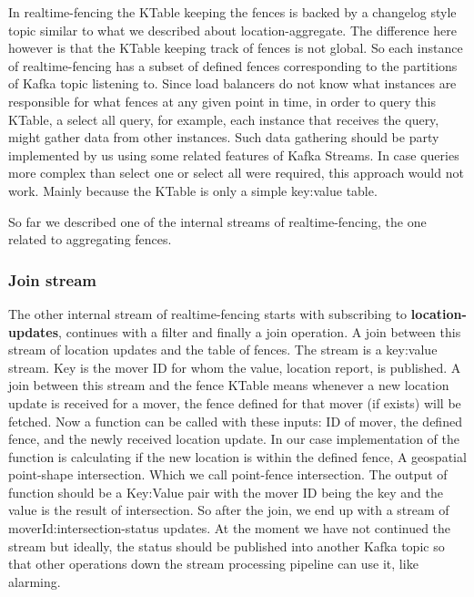 \documentclass[a4]{report}
\begin{document}
    In realtime-fencing the KTable keeping the fences is backed by a changelog style topic similar to what we
    described about location-aggregate.
    The difference here however is that the KTable keeping track of fences is not global.
    So each instance of realtime-fencing has a subset of defined fences corresponding to the partitions of Kafka topic listening to.
    Since load balancers do not know what instances are responsible for what fences at any given point in time, in
    order to query this KTable, a select all query, for example, each instance that receives the query, might gather
    data from other instances.
    Such data gathering should be party implemented by us using some related features of Kafka Streams.
    In case queries more complex than select one or select all were required, this approach would not work.
    Mainly because the KTable is only a simple key:value table.

    So far we described one of the internal streams of realtime-fencing, the one related to aggregating fences.

    \subsubsection{Join stream}
    The other internal stream of realtime-fencing starts with subscribing to \textbf{location-updates}, continues with a
    filter and finally a join operation.
    A join between this stream of location updates and the table of fences.
    The stream is a key:value stream.
    Key is the mover ID for whom the value, location report, is published.
    A join between this stream and the fence KTable means whenever a new location update is received for a mover,
    the fence defined for that mover (if exists) will be fetched.
    Now a function can be called with these inputs: ID of mover, the defined fence, and the newly received location update.
    In our case implementation of the function is calculating if the new location is within the defined fence, A
    geospatial point-shape intersection.
    Which we call point-fence intersection.
    The output of function should be a Key:Value pair with the mover ID being the key and the value is the result of
    intersection.
    So after the join, we end up with a stream of moverId:intersection-status updates.
    At the moment we have not continued the stream but ideally, the status should be published into another Kafka topic so that other operations down the stream processing pipeline can use it, like alarming.
\end{document}
